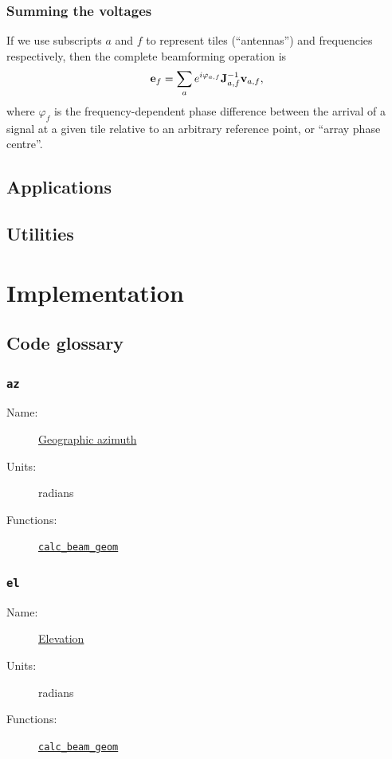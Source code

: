 \documentclass{book}
\begin{document}
\subsection{Summing the voltages}

If we use subscripts $a$ and $f$ to represent tiles (``antennas'') and frequencies respectively, then the complete beamforming operation is
\begin{equation}
    {\bf e}_f = \sum_a e^{i\varphi_{a,f}} {\bf J}_{a,f}^{-1} {\bf v}_{a,f},
\end{equation}
where $\varphi_f$ is the frequency-dependent phase difference between the arrival of a signal at a given tile relative to an arbitrary reference point, or ``array phase centre''.

\section{Applications}

\section{Utilities}

\chapter{Implementation}

\section{Code glossary}

\subsection{\texttt{az}}
\begin{description}
    \item[Name:] \hyperlink{sec:coordslocalsky}{Geographic azimuth}
    \item[Units:] radians
    \item[Functions:] \hyperlink{fcn:calc_beam_geom}{\texttt{calc\_beam\_geom}}
\end{description}

\subsection{\texttt{el}}
\begin{description}
    \item[Name:] \hyperlink{sec:coordslocalsky}{Elevation}
    \item[Units:] radians
    \item[Functions:] \hyperlink{fcn:calc_beam_geom}{\texttt{calc\_beam\_geom}}
\end{description}
\end{document}
